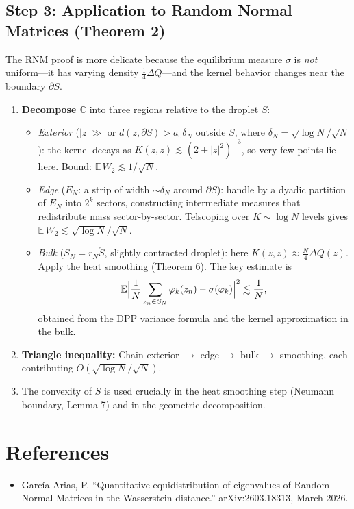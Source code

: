 \documentclass[11pt,a4paper]{article}
\theoremstyle{definition}
\begin{document}
\subsection*{Step 3: Application to Random Normal Matrices (Theorem 2)}

The RNM proof is more delicate because the equilibrium measure $\sigma$ is \emph{not} uniform---it has varying density $\frac{1}{4}\Delta Q$---and the kernel behavior changes near the boundary $\partial S$.

\begin{enumerate}[nosep]
  \item \textbf{Decompose $\mathbb{C}$} into three regions relative to the droplet $S$:
  \begin{itemize}[nosep]
    \item \emph{Exterior} ($|z|\gg$ or $d(z,\partial S)>a_0\delta_N$ outside $S$, where $\delta_N=\sqrt{\log N}/\sqrt{N}$): the kernel decays as $K(z,z)\lesssim (2+|z|^2)^{-3}$, so very few points lie here. Bound: $\mathbb{E}\,W_2\lesssim 1/\sqrt{N}$.
    \item \emph{Edge} ($E_N$: a strip of width $\sim\delta_N$ around $\partial S$): handle by a dyadic partition of $E_N$ into $2^k$ sectors, constructing intermediate measures that redistribute mass sector-by-sector. Telscoping over $K\sim\log N$ levels gives $\mathbb{E}\,W_2\lesssim\sqrt{\log N}/\sqrt{N}$.
    \item \emph{Bulk} ($S_N = r_N\mathring{S}$, slightly contracted droplet): here $K(z,z)\approx\frac{N}{4}\Delta Q(z)$. Apply the heat smoothing (Theorem 6). The key estimate is
    \[
      \mathbb{E}\Bigl|\frac{1}{N}\sum_{z_n\in S_N}\varphi_k(z_n)-\sigma(\varphi_k)\Bigr|^2\lesssim\frac{1}{N},
    \]
    obtained from the DPP variance formula and the kernel approximation in the bulk.
  \end{itemize}
  \item \textbf{Triangle inequality:} Chain exterior $\to$ edge $\to$ bulk $\to$ smoothing, each contributing $O(\sqrt{\log N}/\sqrt{N})$.
  \item The convexity of $S$ is used crucially in the heat smoothing step (Neumann boundary, Lemma 7) and in the geometric decomposition.
\end{enumerate}

\section*{References}
\begin{itemize}[nosep,label={},leftmargin=0pt]
  \item Garc\'ia Arias, P. ``Quantitative equidistribution of eigenvalues of Random Normal Matrices in the Wasserstein distance.'' arXiv:2603.18313, March 2026.
\end{itemize}
\end{document}
